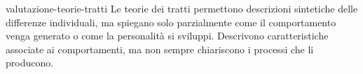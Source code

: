 \documentclass[preview]{standalone}
\begin{document}
\begin{snippet}{valutazione-teorie-tratti}
    Le teorie dei tratti permettono descrizioni sintetiche delle differenze
    individuali, ma spiegano solo parzialmente come il comportamento venga
    generato o come la personalità si sviluppi. Descrivono caratteristiche
    associate ai comportamenti, ma non sempre chiariscono i processi che li
    producono.
\end{snippet}
\end{document}
